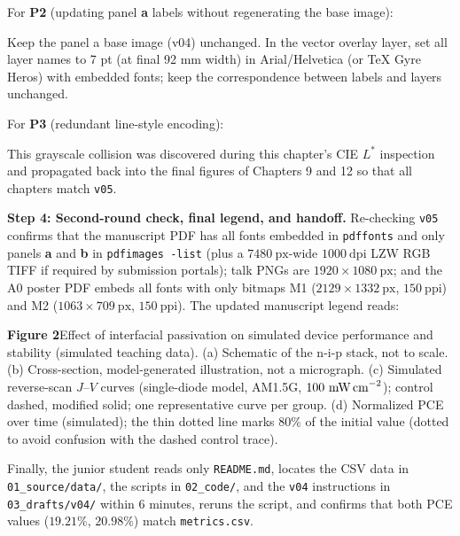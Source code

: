 For \textbf{P2} (updating panel \textbf{a} labels without regenerating the base image):
\begin{Prompt}
Keep the panel a base image (v04) unchanged. In the vector overlay layer, set all layer names to 7 pt (at final 92 mm width)
in Arial/Helvetica (or TeX Gyre Heros) with embedded fonts; keep the correspondence between labels and layers unchanged.
\end{Prompt}

For \textbf{P3} (redundant line-style encoding):
This grayscale collision was discovered during this chapter's CIE $L^*$ inspection and propagated back into the final figures of Chapters 9 and 12 so that all chapters match \texttt{v05}.

\textbf{Step 4: Second-round check, final legend, and handoff.} Re-checking \texttt{v05} confirms that the manuscript PDF has all fonts embedded in \texttt{pdffonts} and only panels \textbf{a} and \textbf{b} in \texttt{pdfimages -list} (plus a $7480\ \text{px}$-wide $1000\ \text{dpi}$ LZW RGB TIFF if required by submission portals); talk PNGs are $1920 \times 1080\ \text{px}$; and the A0 poster PDF embeds all fonts with only bitmaps M1 ($2129 \times 1332\ \text{px}$, $150\ \text{ppi}$) and M2 ($1063 \times 709\ \text{px}$, $150\ \text{ppi}$). The updated manuscript legend reads:

\begin{BookNote}
\textbf{Figure 2}\quad Effect of interfacial passivation on simulated device performance and stability (simulated teaching data). (a) Schematic of the n-i-p stack, not to scale. (b) Cross-section, model-generated illustration, not a micrograph. (c) Simulated reverse-scan $J\text{--}V$ curves (single-diode model, AM1.5G, $100\ \text{mW\,cm}^{-2}$); control dashed, modified solid; one representative curve per group. (d) Normalized PCE over time (simulated); the thin dotted line marks 80\% of the initial value (dotted to avoid confusion with the dashed control trace).
\end{BookNote}

Finally, the junior student reads only \texttt{README.md}, locates the CSV data in \texttt{01\_source/\allowbreak data/}, the scripts in \texttt{02\_code/}, and the \texttt{v04} instructions in \texttt{03\_drafts/\allowbreak v04/} within 6 minutes, reruns the script, and confirms that both PCE values ($19.21\%$, $20.98\%$) match \texttt{metrics.csv}.

